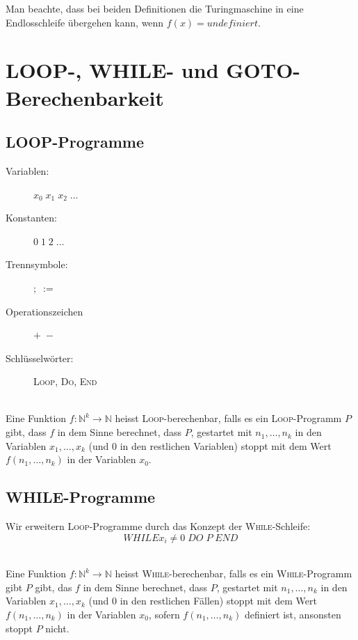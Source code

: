 \documentclass{scrartcl}
\begin{document}
Man beachte, dass bei beiden Definitionen die Turingmaschine in eine Endlosschleife übergehen kann, wenn $f(x)=undefiniert$.

\section*{LOOP-, WHILE- und GOTO-Berechenbarkeit}
\subsection*{LOOP-Programme}
\begin{description}
    \item[Variablen:] $x_0\;x_1\;x_2\;\dots$
    \item[Konstanten:] $0\;1\;2\;\dots$
    \item[Trennsymbole:] $;\; :=$
    \item[Operationszeichen] $+\;-$
    \item[Schlüsselwörter:] \textsc{Loop}, \textsc{Do}, \textsc{End}
\end{description}

\begin{shaded}
    \ \\Eine Funktion $f: \mathds{N}^k\to \mathds{N}$ heisst \textsc{Loop}-berechenbar, falls es ein \textsc{Loop}-Programm $P$ gibt, dass $f$ in dem Sinne berechnet, dass $P$, gestartet mit $n_1,\dots,n_k$ in den Variablen $x_1,\dots,x_k$ (und $0$ in den restlichen Variablen) stoppt mit dem Wert $f(n_1,\dots,n_k)$ in der Variablen $x_0$.
\end{shaded}

\subsection*{WHILE-Programme}
Wir erweitern \textsc{Loop}-Programme durch das Konzept der \textsc{While}-Schleife: \[ WHILE x_i\not=0\; DO\; P\; END \]

\begin{shaded}
    \ \\Eine Funktion $f:\mathds{N}^k\to \mathds{N}$ heisst \textsc{While}-berechenbar, falls es ein \textsc{While}-Programm gibt $P$ gibt, das $f$ in dem Sinne berechnet, dass $P$, gestartet mit $n_1,\dots,n_k$ in den Variablen $x_1,\dots,x_k$ (und 0 in den restlichen Fällen) stoppt mit dem Wert $f(n_1,\dots,n_k)$ in der Variablen $x_0$, sofern $f(n_1,\dots,n_k)$ definiert ist, ansonsten stoppt $P$ nicht.
\end{shaded}
\end{document}
